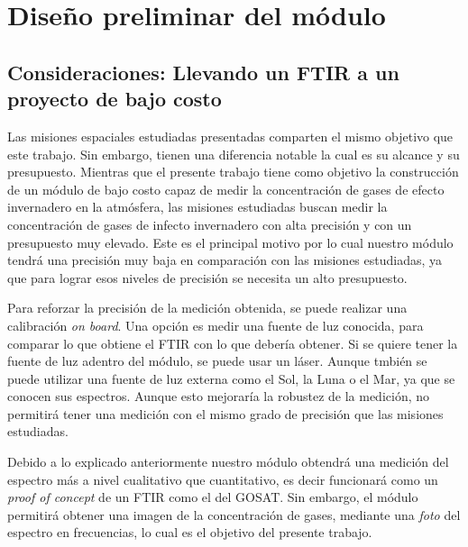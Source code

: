 \documentclass[11pt,titlepage]{article}
\begin{document}




\section{Diseño preliminar del módulo}




\subsection{Consideraciones: Llevando un FTIR a un proyecto de bajo costo}

Las misiones espaciales estudiadas presentadas comparten el mismo objetivo que este trabajo. Sin embargo, tienen una diferencia notable la cual es su alcance y su presupuesto. Mientras que el presente trabajo tiene como objetivo la construcción de un módulo de bajo costo capaz de medir la concentración de gases de efecto invernadero en la atmósfera, las misiones estudiadas buscan medir la concentración de gases de infecto invernadero con alta precisión y con un presupuesto muy elevado. Este es el principal motivo por lo cual nuestro módulo tendrá una precisión muy baja en comparación con las misiones estudiadas, ya que para lograr esos niveles de precisión se necesita un alto presupuesto. \par
Para reforzar la precisión de la medición obtenida, se puede realizar una calibración \textit{on board}. Una opción es medir una fuente de luz conocida, para comparar lo que obtiene el FTIR con lo que debería obtener. Si se quiere tener la fuente de luz adentro del módulo, se puede usar un láser. Aunque tmbién se puede utilizar una fuente de luz externa como el Sol, la Luna o el Mar, ya que se conocen sus espectros. Aunque esto mejoraría la robustez de la medición, no permitirá tener una medición con el mismo grado de precisión que las misiones estudiadas. \par
Debido a lo explicado anteriormente nuestro módulo obtendrá una medición del espectro más a nivel cualitativo que cuantitativo, es decir funcionará como un \textit{proof of concept} de un FTIR como el del GOSAT. Sin embargo, el módulo permitirá obtener una imagen de la concentración de gases, mediante una \textit{foto} del espectro en frecuencias, lo cual es el objetivo del presente trabajo.
\end{document}
